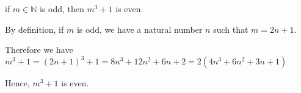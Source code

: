 if $m \in \mathbb{N}$ is odd, then $m^3 + 1$ is even.

By definition, if $m$ is odd, we have a natural number $n$ such that $m = 2n + 1$.

Therefore we have $m^3 + 1 = (2n + 1)^3 + 1 = 8n ^ 3 + 12 n ^ 2 + 6 n + 2 = 2 (4n^3 + 6n^2 + 3n + 1)$

Hence, $m^3 + 1$ is even.